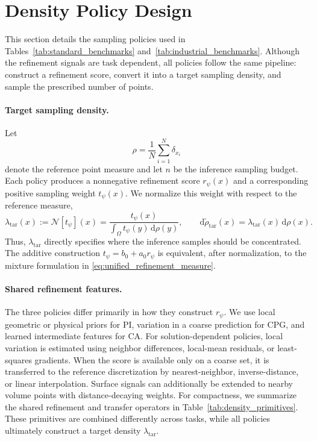 \section{Density Policy Design}
\label{app:density_policy_design}

This section details the sampling policies used in
Tables~\ref{tab:standard_benchmarks} and~\ref{tab:industrial_benchmarks}.
Although the refinement signals are task dependent, all policies follow the
same pipeline: construct a refinement score, convert it into a target sampling
density, and sample the prescribed number of points.

\paragraph{Target sampling density.}
Let
\[
    \rho=\frac{1}{N}\sum_{i=1}^{N}\delta_{x_i}
\]
denote the reference point measure and let $n$ be the inference sampling
budget. Each policy produces a nonnegative refinement score $r_\psi(x)$ and
a corresponding positive sampling weight $t_\psi(x)$. We normalize this weight
with respect to the reference measure,
\begin{equation}
    \lambda_{\mathrm{tar}}(x)
    :=\mathcal{N}[t_\psi](x)
    =\frac{t_\psi(x)}
         {\int_\Omega t_\psi(y)\,\mathrm{d}\rho(y)},
    \qquad
    \mathrm{d}\widetilde{\rho}_{\mathrm{tar}}(x)
    =
    \lambda_{\mathrm{tar}}(x)\,\mathrm{d}\rho(x).
    \label{eq:app_target_density}
\end{equation}
Thus, $\lambda_{\mathrm{tar}}$ directly specifies where the inference samples
should be concentrated. The additive construction
$t_\psi=b_0+a_0r_\psi$ is equivalent, after normalization, to the mixture
formulation in \eqref{eq:unified_refinement_measure}.

\paragraph{Shared refinement features.}
The three policies differ primarily in how they construct $r_\psi$.
We use local geometric or physical priors for PI, variation in a coarse
prediction for CPG, and learned intermediate features for CA.
For solution-dependent policies, local variation is estimated using
neighbor differences, local-mean residuals, or least-squares gradients.
When the score is available only on a coarse set, it is transferred to the
reference discretization by nearest-neighbor, inverse-distance, or linear
interpolation. Surface signals can additionally be extended to nearby volume
points with distance-decaying weights.  For compactness, we summarize the shared refinement and transfer operators in Table~\ref{tab:density_primitives}. These primitives are combined differently across tasks, while all policies ultimately construct a target density \(\lambda_{\mathrm{tar}}\).

